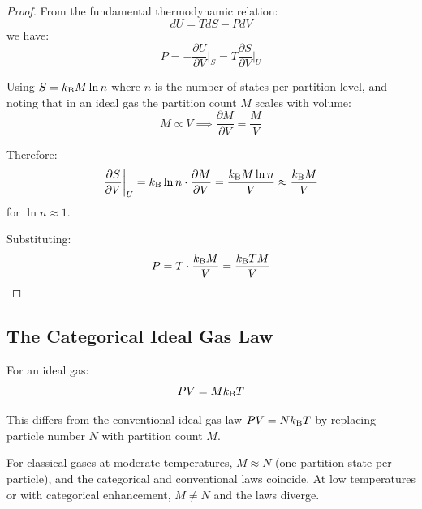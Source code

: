 \begin{proof}
From the fundamental thermodynamic relation:
\begin{equation}
dU = TdS - PdV
\end{equation}
we have:
\begin{equation}
P = -\frac{\partial U}{\partial V}\bigg|_S = T\frac{\partial S}{\partial V}\bigg|_U
\end{equation}

Using $S = k_{\mathrm{B}} M \ln n$ where $n$ is the number of states per partition level, and noting that in an ideal gas the partition count $M$ scales with volume:
\begin{equation}
M \propto V \implies \frac{\partial M}{\partial V} = \frac{M}{V}
\end{equation}

Therefore:
\begin{equation}
\frac{\partial S}{\partial V}\bigg|_U = k_{\mathrm{B}} \ln n \cdot \frac{\partial M}{\partial V} = \frac{k_{\mathrm{B}} M \ln n}{V} \approx \frac{k_{\mathrm{B}} M}{V}
\end{equation}
for $\ln n \approx 1$.

Substituting:
\begin{equation}
P = T \cdot \frac{k_{\mathrm{B}} M}{V} = \frac{k_{\mathrm{B}} T M}{V}
\end{equation}
\end{proof}

\subsection{The Categorical Ideal Gas Law}

\begin{corollary}
\label{cor:ideal_gas}
For an ideal gas:
\begin{equation}
PV = M k_{\mathrm{B}} T
\label{eq:categorical_ideal_gas}
\end{equation}
\end{corollary}

This differs from the conventional ideal gas law $PV = Nk_{\mathrm{B}} T$ by replacing particle number $N$ with partition count $M$.

\begin{remark}
For classical gases at moderate temperatures, $M \approx N$ (one partition state per particle), and the categorical and conventional laws coincide. At low temperatures or with categorical enhancement, $M \neq N$ and the laws diverge.
\end{remark}

